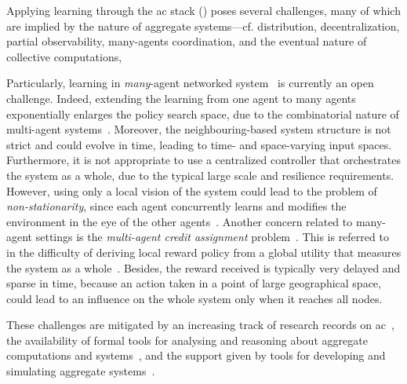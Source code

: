 Applying learning through the \ac{ac} stack () poses several challenges,
 many of which are implied by 
 the nature of aggregate systems---cf.
 distribution, 
 decentralization, 
 partial observability,
 many-agents coordination, and
 the eventual nature of collective computations,
  

Particularly, learning in \emph{many}-agent networked system~\cite{DBLP:journals/jzusc/ZhangYB21} is currently an open challenge.
%
Indeed, extending the learning from one agent to many agents exponentially enlarges the policy search space, due to the combinatorial nature of multi-agent systems~\cite{DBLP:journals/aamas/Hernandez-LealK19}.
%
Moreover, the neighbouring-based system structure is not strict and could evolve in time, leading to time- and space-varying input spaces.
%
Furthermore, it is not appropriate to use a centralized controller that orchestrates the system as a whole, due to the typical large scale and resilience requirements.
%
However, using only a local vision of the system could lead to the problem of \emph{non-stationarity}, since each agent concurrently learns and modifies the environment in the eye of the other agents~\cite{DBLP:journals/aim/TuylsW12}.
%
Another concern related to many-agent settings is the \emph{multi-agent credit assignment} problem~\cite{DBLP:books/lib/SuttonB98}.
%
This is referred to in the difficulty of deriving local reward policy from a global utility that measures the system as a whole~\cite{DBLP:conf/atal/AgoginoT04,DBLP:books/lib/SuttonB98}. 
%
Besides, the reward received is typically very delayed and sparse in time, because an action taken in a point of large geographical space, could lead to an influence on the whole system only when it reaches all nodes.

These challenges are mitigated 
 by an increasing track of research records on \ac{ac}~\cite{DBLP:journals/jlap/ViroliBDACP19},
 the availability of formal tools for 
 analysing and reasoning about aggregate computations and systems~\cite{DBLP:journals/jlap/ViroliBDACP19},
 and the support given by tools for 
 developing and simulating aggregate systems~\cite{DBLP:journals/jlap/ViroliBDACP19}.
